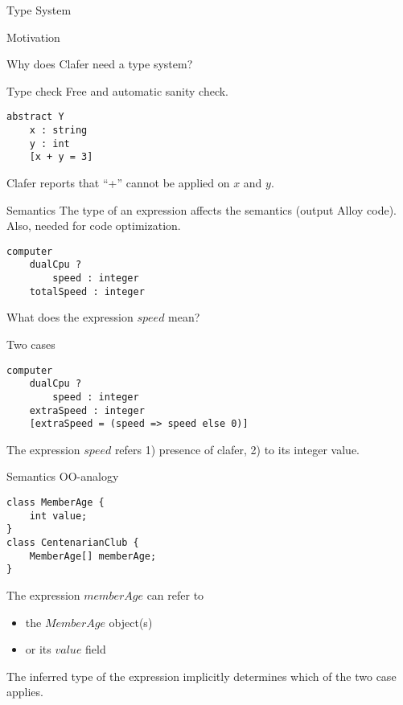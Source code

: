 \documentclass[table,15pt,t]{beamer}
\newcommand{\vmiddle}[1]{
  \vspace{\stretch{1}}
  #1
  \vspace{\stretch{1}}
}
\newcommand{\interframe}[1]{
\begin{frame}{}
\vmiddle{\hmiddle{\Huge #1}}
\end{frame}
}
\newcommand{\hmiddle}[1]{
  \begin{center}#1\end{center}
}
\begin{document}
\interframe{Type System}

\begin{frame}{Motivation}
\vmiddle{Why does Clafer need a type system?}
\end{frame}

\begin{frame}[fragile,c]{Type check}
Free and automatic sanity check.
\vfill \begin{lstlisting}
abstract Y
    x : string
    y : int
    [x + y = 3]
\end{lstlisting}
Clafer reports that ``+'' cannot be applied on $x$ and $y$.
\end{frame}

\begin{frame}[fragile,c]{Semantics}
The type of an expression affects the semantics (output Alloy code). Also, needed for code optimization.
\vfill \begin{lstlisting}
computer
    dualCpu ?
        speed : integer
    totalSpeed : integer
\end{lstlisting}
What does the expression $speed$ mean?
\end{frame}

\begin{frame}[fragile,c]{Two cases}
\begin{lstlisting}
computer
    dualCpu ?
        speed : integer
    extraSpeed : integer
    [extraSpeed = (speed => speed else 0)]
\end{lstlisting}
The expression $speed$ refers 1) presence of clafer, 2) to its integer value.
\end{frame}

\begin{frame}[fragile,c]{Semantics OO-analogy}
\lstset{language=Java}
\begin{lstlisting}
class MemberAge {
    int value;
}
class CentenarianClub {
    MemberAge[] memberAge;
}
\end{lstlisting}
The expression $memberAge$ can refer to
\begin{itemize}
\item the $MemberAge$ object(s)
\item or its $value$ field
\end{itemize}

The inferred type of the expression implicitly determines which of the two case applies.
\end{frame}
\end{document}
